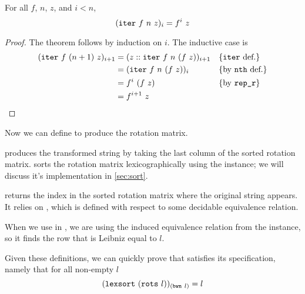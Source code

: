 \documentclass[11pt]{thesis}
\begin{document}
\begin{theorem}
  For all $f$, $n$, $z$, and $i < n$,
  \begin{equation}
    (\texttt{iter}~f~n~z)_i = f^i~z
  \end{equation}
\end{theorem}
\begin{proof}
  The theorem follows by induction on $i$. The inductive case is
  \begin{align*}
       (\texttt{iter}~f~(n+1)~z)_{i+1}
    &= (z :: \texttt{iter}~f~n~(f~z))_{i+1} &&\{\text{\texttt{iter} def.}\} \\
    &= (\texttt{iter}~f~n~(f~z))_i          &&\{\text{by \texttt{nth} def.}\} \\
    &= f^i~(f~z)                            &&\{\text{by \texttt{rep\_r}}\} \\
    &= f^{i+1}~z && \qedhere
  \end{align*}
\end{proof}

Now we can define  to produce the rotation matrix.


 produces the transformed string by taking the last column
of the sorted rotation matrix.  sorts the rotation
matrix lexicographically using the  instance; we will
discuss it's implementation in \cref{sec:sort}.


 returns the index in the sorted rotation matrix where the
original string appears. It relies on , which is
defined with respect to some decidable equivalence relation.


When we use  in , we are using the
induced equivalence relation from the  instance, so it
finds the row that is Leibniz equal to $l$.


Given these definitions, we can quickly prove that 
satisfies its specification, namely that for all non-empty $l$
\begin{equation*}
    (\texttt{lexsort}~(\texttt{rots}~l))_{(\texttt{bwn}~l)} = l
\end{equation*}
\end{document}
